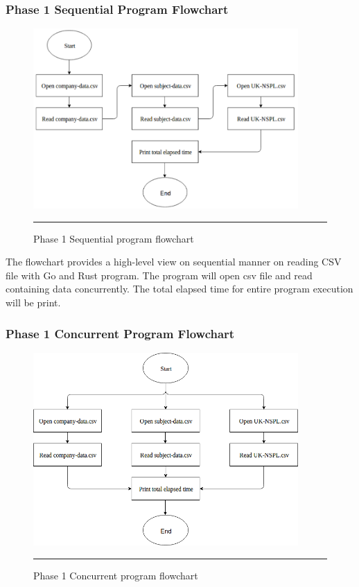 \subsubsection{Phase 1 Sequential Program Flowchart}

\begin{figure}[H]
	\centering
	\includegraphics[width=0.9\textwidth]{Figure/seq-read-csv.png}
	\rule{35em}{0.5pt}
	\caption[Phase 1 Sequential program flowchart]{Phase 1 Sequential program flowchart}
\end{figure}

The flowchart provides a high-level view on sequential manner on reading CSV file with Go and Rust program. The program will open csv file and read containing data concurrently. The total elapsed time for entire program execution will be print.

\subsubsection{Phase 1 Concurrent Program Flowchart}

\begin{figure}[H]
	\centering
	\includegraphics[width=0.9\textwidth]{Figure/concurrent-read-csv.png}
	\rule{35em}{0.5pt}
	\caption[Phase 1 Concurrent program flowchart]{Phase 1 Concurrent program flowchart}
\end{figure}

